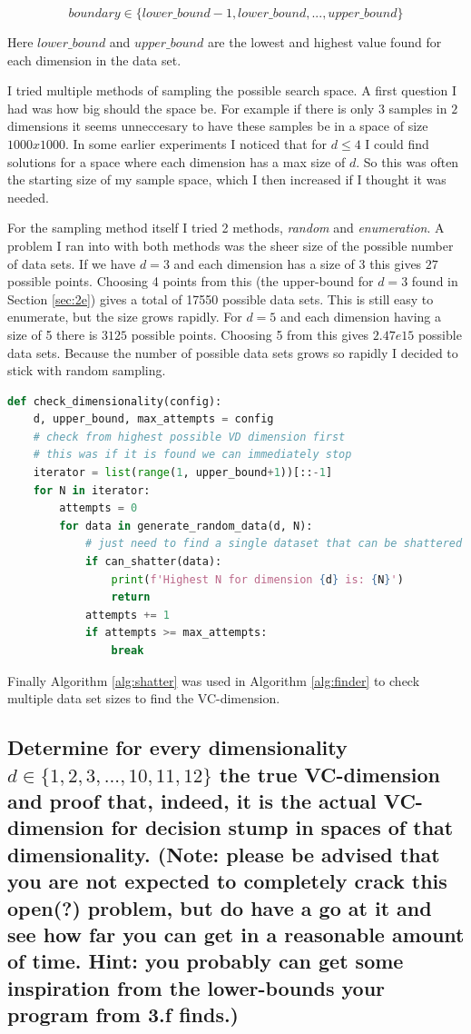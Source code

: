 \documentclass[11pt,a4paper]{article}
\begin{document}
\[ boundary \in \{lower\_bound - 1, lower\_bound, ..., upper\_bound\} \]

Here $lower\_bound$ and $upper\_bound$ are the lowest and highest value found for each dimension in the data set. 

I tried multiple methods of sampling the possible search space. A first question I had was how big should the space be. For example if there is only $3$ samples in $2$ dimensions it seems unneccesary to have these samples be in a space of size $1000x1000$. In some earlier experiments I noticed that for $d \leq 4$ I could find solutions for a space where each dimension has a max size of $d$. So this was often the starting size of my sample space, which I then increased if I thought it was needed.

For the sampling method itself I tried 2 methods, \textit{random} and \textit{enumeration}. A problem I ran into with both methods was the sheer size of the possible number of data sets. If we have $d=3$ and each dimension has a size of $3$ this gives $27$ possible points. Choosing 4 points from this (the upper-bound for $d=3$ found in Section \ref{sec:2e}) gives a total of 17550 possible data sets. This is still easy to enumerate, but the size grows rapidly. For $d=5$ and each dimension having a size of 5 there is $3125$ possible points. Choosing 5 from this gives $2.47e15$ possible data sets. Because the number of possible data sets grows so rapidly I decided to stick with random sampling.

\begin{lstlisting}[language=Python, caption=Dimensionality Check, label={alg:finder}]
def check_dimensionality(config):
    d, upper_bound, max_attempts = config
    # check from highest possible VD dimension first
    # this was if it is found we can immediately stop
    iterator = list(range(1, upper_bound+1))[::-1]
    for N in iterator:
        attempts = 0
        for data in generate_random_data(d, N):
            # just need to find a single dataset that can be shattered
            if can_shatter(data):
                print(f'Highest N for dimension {d} is: {N}')
                return
            attempts += 1
            if attempts >= max_attempts:
                break
    \end{lstlisting}

Finally Algorithm \ref{alg:shatter} was used in Algorithm \ref{alg:finder} to check multiple data set sizes to find the VC-dimension.

\subsection{Determine for every dimensionality $d ∈ \{1, 2, 3, . . . , 10, 11, 12\}$ the true VC-dimension and proof that, indeed, it is the actual VC-dimension for decision stump in spaces of that dimensionality. (Note: please be advised that you are not expected to completely crack this open(?) problem, but do have a go at it and see how far you can get in a reasonable amount of time. Hint: you probably can get some inspiration from the lower-bounds your program from 3.f finds.)}
\label{sec:2g}
\end{document}
